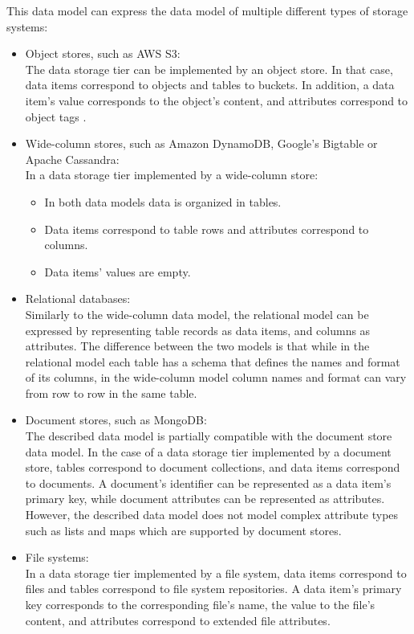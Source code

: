 This data model can express the data model of multiple different types of storage systems:
\begin{itemize}
  \item Object stores, such as AWS S3: \\
  The data storage tier can be implemented by an object store.
  In that case, data items correspond to objects and tables to buckets.
  In addition, a data item's value corresponds to the object's content, and attributes correspond to object
  tags \cite{awss3:tagging}.
  \item Wide-column stores, such as Amazon DynamoDB, Google's Bigtable or Apache Cassandra: \\
  In a data storage tier implemented by a wide-column store:
  \begin{itemize}
    \item In both data models data is organized in tables.
    \item Data items correspond to table rows and attributes correspond to columns.
    \item Data items' values are empty.
  \end{itemize}
  \item Relational databases: \\
  Similarly to the wide-column data model, the relational model can be expressed by representing table records as data items,
  and columns as attributes.
  The difference between the two models is that while in the relational model each table has a schema that defines the
  names and format of its columns, in the wide-column model column names and format can vary from row to row in the same
  table.
  \item Document stores, such as MongoDB: \\
  The described data model is partially compatible with the document store data model.
  In the case of a data storage tier implemented by a document store, tables correspond to document collections, and
  data items correspond to documents.
  A document's identifier can be represented as a data item's primary key, while document attributes can be represented
  as attributes.
  However, the described data model does not model complex attribute types such as lists and maps which are supported by
  document stores.
  \item File systems: \\
  In a data storage tier implemented by a file system, data items correspond to files and tables correspond to file
  system repositories.
  A data item's primary key corresponds to the corresponding file's name, the value to the file's content, and attributes
  correspond to extended file attributes.
\end{itemize}

